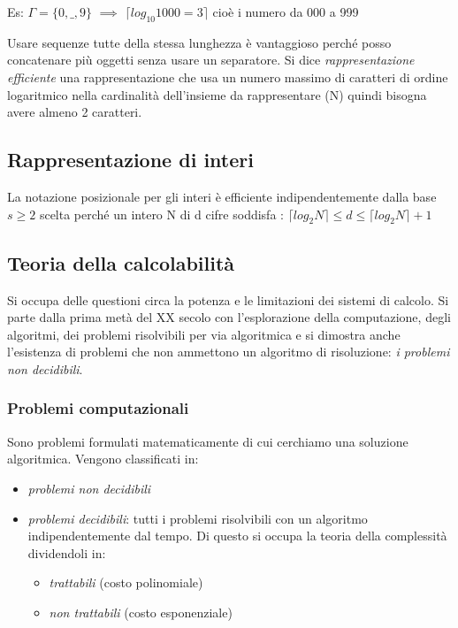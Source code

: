 Es: $\Gamma = \{0, \_, 9 \}$ $\implies$ $\lceil log_{10}1000 = 3 \rceil$ cioè i numero da 000 a 999

Usare sequenze tutte della stessa lunghezza è vantaggioso perché posso concatenare più oggetti senza usare un separatore. Si dice \emph{rappresentazione efficiente} una rappresentazione che usa un numero massimo di caratteri di ordine logaritmico nella cardinalità dell'insieme da rappresentare (N) quindi bisogna avere almeno 2 caratteri.

\subsection{Rappresentazione di interi}
La notazione posizionale per gli interi è efficiente indipendentemente dalla base $s \geq 2$ scelta perché un intero N di d cifre soddisfa : $\lceil log_{2}N \rceil \leq d \leq \lceil log_{2}N \rceil + 1$

\subsection{Teoria della calcolabilità}
Si occupa delle questioni circa la potenza e le limitazioni dei sistemi di calcolo. Si parte dalla prima metà del XX secolo con l'esplorazione della computazione, degli algoritmi, dei problemi risolvibili per via algoritmica e si dimostra anche l'esistenza di problemi che non ammettono un algoritmo di risoluzione: \emph{i problemi non decidibili}.

\subsubsection{Problemi computazionali}
Sono problemi formulati matematicamente di cui cerchiamo una soluzione algoritmica. Vengono classificati in:
\begin{itemize}
    \item \emph{problemi non decidibili}
    \item \emph{problemi decidibili}: tutti i problemi risolvibili con un algoritmo indipendentemente dal tempo. Di questo si occupa la teoria della complessità dividendoli in:
    \begin{itemize}
        \item \emph{trattabili} (costo polinomiale)
        \item \emph{non trattabili} (costo esponenziale)
    \end{itemize}
\end{itemize}

